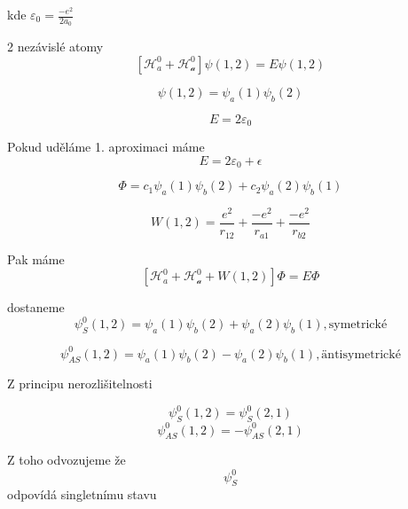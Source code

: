 \documentclass[../main.tex]{subfiles}
\begin{document}
kde $\varepsilon_0 = \frac{- e^2}{2a_0}$


2 nezávislé atomy 
\begin{equation}
    \left[ \mathcal{H}_a^0 + \mathcal{H_a^0} \right] \psi(1,2) = E \psi(1,2)
\end{equation}

\begin{equation}
    \psi(1,2) = \psi_a(1)\psi_b(2)
\end{equation}

\begin{equation}
    E = 2 \varepsilon_0
\end{equation}

Pokud uděláme 1. aproximaci máme 
\begin{equation}
    E = 2 \varepsilon_0 + \epsilon
\end{equation}

\begin{equation}
    \Phi = c_1 \psi_a(1)\psi_b(2) + c_2 \psi_a(2)\psi_b(1)
\end{equation}

\begin{equation}
    W(1,2) = \frac{e^2}{r_{12}} + \frac{-e^2}{r_{a1}} + \frac{-e^2}{r_{b2}}
\end{equation}

Pak máme 
\begin{equation}
    \left[ \mathcal{H}_a^0 + \mathcal{H_a^0} + W(1,2) \right] \Phi  = E \Phi
\end{equation}

dostaneme
\begin{equation}
    \psi^0_S (1,2) = \psi_a(1) \psi_b(2) + \psi_a(2) \psi_b(1), \text{symetrické}
\end{equation}


\begin{equation}
    \psi^0_{AS} (1,2) = \psi_a(1) \psi_b(2) - \psi_a(2) \psi_b(1), \text{äntisymetrické}
\end{equation}

Z principu nerozlišitelnosti

\begin{equation}
    \psi^0_S (1,2) = \psi^0_S (2,1)
\end{equation}
\begin{equation}
    \psi^0_{AS} (1,2) = - \psi^0_{AS} (2,1)
\end{equation}

Z toho odvozujeme že \begin{equation}
    \psi^0_{S} 
\end{equation}
odpovídá singletnímu stavu
\end{document}
